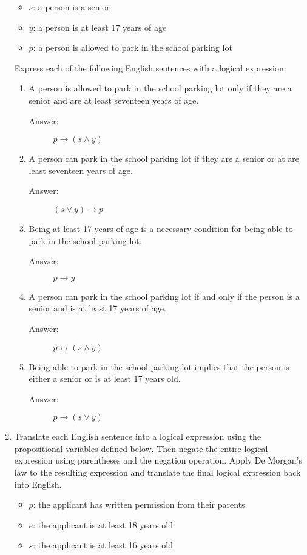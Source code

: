 \documentclass[12pt, oneside]{article}
\begin{document}
\begin{enumerate}
\begin{itemize}
    \item $s$: a person is a senior
    \item $y$: a person is at least 17 years of age
    \item $p$: a person is allowed to park in the school parking lot
\end{itemize}
Express each of the following English sentences with a logical expression:
\begin{enumerate}
    \item A person is allowed to park in the school parking lot only if they are a senior and are at least seventeen years of age.
    \begin{description}
        \item[Answer:] $p\rightarrow (s\land y)$
    \end{description}
    \item A person can park in the school parking lot if they are a senior or at are least seventeen years of age.
    \begin{description}
        \item[Answer:] $(s\lor y)\rightarrow p$
    \end{description}
    \item Being at least 17 years of age is a necessary condition for being able to park in the school parking lot.
    \begin{description}
        \item[Answer:] $p\rightarrow y$
    \end{description}
    \item A person can park in the school parking lot if and only if the person is a senior and is at least 17 years of age.
    \begin{description}
        \item[Answer:] $p\leftrightarrow (s\land y)$
    \end{description}
    \item Being able to park in the school parking lot implies that the person is either a senior or is at least 17 years old.
    \begin{description}
        \item[Answer:] $p\rightarrow (s\lor y)$
    \end{description}
\end{enumerate}

\item Translate each English sentence into a logical expression using the propositional variables defined below. Then negate the entire logical expression using parentheses and the negation operation. Apply De Morgan's law to the resulting expression and translate the final logical expression back into English.
\begin{itemize}
    \item $p$: the applicant has written permission from their parents
    \item $e$: the applicant is at least 18 years old
    \item $s$: the applicant is at least 16 years old
\end{itemize}


\end{enumerate}
\end{document}
